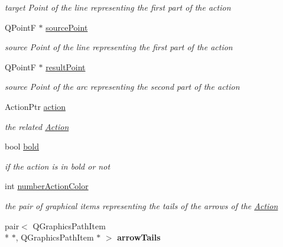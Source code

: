 \begin{DoxyCompactItemize}
\begin{DoxyCompactList}\small\item\em target Point of the line representing the first part of the action \end{DoxyCompactList}\item 
\hypertarget{classGAction_adf67bcd561238d7626566cebeee2a151}{Q\+Point\+F $\ast$ \hyperlink{classGAction_adf67bcd561238d7626566cebeee2a151}{source\+Point}}\label{classGAction_adf67bcd561238d7626566cebeee2a151}

\begin{DoxyCompactList}\small\item\em source Point of the line representing the first part of the action \end{DoxyCompactList}\item 
\hypertarget{classGAction_a08d6b4a2f2d04a46861dafbe38897d8a}{Q\+Point\+F $\ast$ \hyperlink{classGAction_a08d6b4a2f2d04a46861dafbe38897d8a}{result\+Point}}\label{classGAction_a08d6b4a2f2d04a46861dafbe38897d8a}

\begin{DoxyCompactList}\small\item\em source Point of the arc representing the second part of the action \end{DoxyCompactList}\item 
\hypertarget{classGAction_a22f734f6fb2fade298681819341b4f75}{Action\+Ptr \hyperlink{classGAction_a22f734f6fb2fade298681819341b4f75}{action}}\label{classGAction_a22f734f6fb2fade298681819341b4f75}

\begin{DoxyCompactList}\small\item\em the related \hyperlink{classAction}{Action} \end{DoxyCompactList}\item 
\hypertarget{classGAction_a806d5854710a68e9d59a0b035628f7a4}{bool \hyperlink{classGAction_a806d5854710a68e9d59a0b035628f7a4}{bold}}\label{classGAction_a806d5854710a68e9d59a0b035628f7a4}

\begin{DoxyCompactList}\small\item\em if the action is in bold or not \end{DoxyCompactList}\item 
int \hyperlink{classGAction_aaa7f90de74ad249e8c0054728d1339d1}{number\+Action\+Color}
\begin{DoxyCompactList}\small\item\em the pair of graphical items representing the tails of the arrows of the \hyperlink{classAction}{Action} \end{DoxyCompactList}\item 
\hypertarget{classGAction_abc626fc7dc52a5f02960706c02a52db9}{pair$<$ Q\+Graphics\+Path\+Item \\*
$\ast$, Q\+Graphics\+Path\+Item $\ast$ $>$ {\bfseries arrow\+Tails}}\label{classGAction_abc626fc7dc52a5f02960706c02a52db9}


\end{DoxyCompactItemize}

